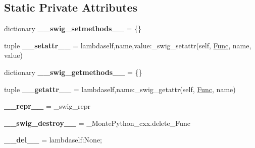 \subsection*{Static Private Attributes}
\begin{DoxyCompactItemize}
\item 
\hypertarget{classMontePython__cxx_1_1Func_acc8467835ccaf51d589694f96ecdd97c}{}dictionary {\bfseries \+\_\+\+\_\+swig\+\_\+setmethods\+\_\+\+\_\+} = \{\}\label{classMontePython__cxx_1_1Func_acc8467835ccaf51d589694f96ecdd97c}

\item 
\hypertarget{classMontePython__cxx_1_1Func_a457342b683008ffdf90e97b30c3e10fb}{}tuple {\bfseries \+\_\+\+\_\+setattr\+\_\+\+\_\+} = lambdaself,name,value\+:\+\_\+swig\+\_\+setattr(self, \hyperlink{classMontePython__cxx_1_1Func}{Func}, name, value)\label{classMontePython__cxx_1_1Func_a457342b683008ffdf90e97b30c3e10fb}

\item 
\hypertarget{classMontePython__cxx_1_1Func_aaef40405a6d762fce14f2322452de850}{}dictionary {\bfseries \+\_\+\+\_\+swig\+\_\+getmethods\+\_\+\+\_\+} = \{\}\label{classMontePython__cxx_1_1Func_aaef40405a6d762fce14f2322452de850}

\item 
\hypertarget{classMontePython__cxx_1_1Func_a4d48a675dbe5edcb31f14859e854e623}{}tuple {\bfseries \+\_\+\+\_\+getattr\+\_\+\+\_\+} = lambdaself,name\+:\+\_\+swig\+\_\+getattr(self, \hyperlink{classMontePython__cxx_1_1Func}{Func}, name)\label{classMontePython__cxx_1_1Func_a4d48a675dbe5edcb31f14859e854e623}

\item 
\hypertarget{classMontePython__cxx_1_1Func_a6ef995a5f62c27f14e6582f2364b1a93}{}{\bfseries \+\_\+\+\_\+repr\+\_\+\+\_\+} = \+\_\+swig\+\_\+repr\label{classMontePython__cxx_1_1Func_a6ef995a5f62c27f14e6582f2364b1a93}

\item 
\hypertarget{classMontePython__cxx_1_1Func_abc63cc68234e25e9aa81216559b28d11}{}{\bfseries \+\_\+\+\_\+swig\+\_\+destroy\+\_\+\+\_\+} = \+\_\+\+Monte\+Python\+\_\+cxx.\+delete\+\_\+\+Func\label{classMontePython__cxx_1_1Func_abc63cc68234e25e9aa81216559b28d11}

\item 
\hypertarget{classMontePython__cxx_1_1Func_aa9b7f85168babb643a6264c1c4c5e1db}{}{\bfseries \+\_\+\+\_\+del\+\_\+\+\_\+} = lambdaself\+:\+None;\label{classMontePython__cxx_1_1Func_aa9b7f85168babb643a6264c1c4c5e1db}

\end{DoxyCompactItemize}


